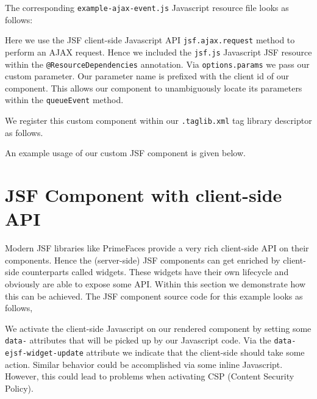 The corresponding \texttt{example-ajax-event.js} Javascript resource file looks as follows:

Here we use the JSF client-side Javascript API \texttt{jsf.ajax.request} method to perform an AJAX request.
Hence we included the \texttt{jsf.js} Javascript JSF resource within the \texttt{@ResourceDependencies} annotation.
Via \texttt{options.params} we pass our custom parameter.
Our parameter name is prefixed with the client id of our component.
This allows our component to unambiguously locate its parameters within the \texttt{queueEvent} method.

We register this custom component within our \texttt{.taglib.xml} tag library descriptor as follows.


An example usage of our custom JSF component is given below.


\section{JSF Component with client-side API}
\label{sec:widgets}
Modern JSF libraries like PrimeFaces provide a very rich client-side API on their components.
Hence the (server-side) JSF components can get enriched by client-side counterparts called widgets.
These widgets have their own lifecycle and obviously are able to expose some API.
Within this section we demonstrate how this can be achieved.
The JSF component source code for this example looks as follows,

We activate the client-side Javascript on our rendered component by setting some \texttt{data-} attributes that will be picked up by our Javascript code.
Via the \texttt{data-ejsf-widget\allowbreak -update} attribute we indicate that the client-side should take some action.
Similar behavior could be accomplished via some inline Javascript.
However, this could lead to problems when activating CSP (Content Security Policy).

